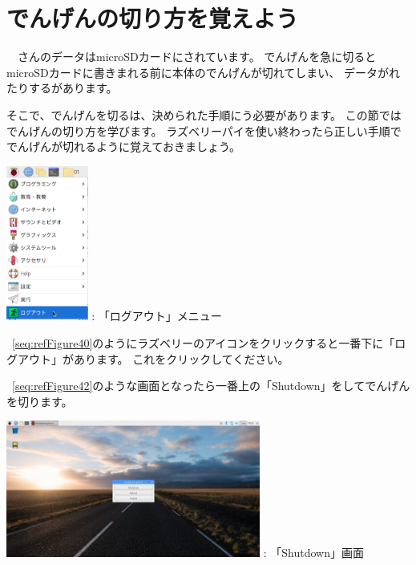 \documentclass[a4paper,12pt]{jarticle}
\begin{document}
\section{でんげんの切り方を覚えよう}
\ \ さんのデータはmicroSDカードにされています。
でんげんを急に切るとmicroSDカードに書きまれる前に本体のでんげんが切れてしまい、
データがれたりするがあります。

そこで、でんげんを切るは、決められた手順にう必要があります。
この節ではでんげんの切り方を学びます。
ラズベリーパイを使い終わったら正しい手順ででんげんが切れるように覚えておきましょう。



\centering
\begin{minipage}{8.115cm}
  {\upshape
    \centering
    \includegraphics[height=5.1cm]{textbook-img206.png}
    \newline
    {\theFigure\label{seq:refFigure40}}: 「ログアウト」メニュー}
\end{minipage}
\begin{minipage}{7.115cm}
  ~\ref{seq:refFigure40}のようにラズベリーのアイコンをクリックすると一番下に「ログアウト」があります。
  これをクリックしてください。
\end{minipage}
\bigskip


\flushleft
\textcolor[rgb]{0.13333334,0.13333334,0.13333334}{~\ref{seq:refFigure42}のような画面となったら一番上の「Shutdown」をしてでんげんを切ります。}
\bigskip
\centering
\begin{minipage}{8.225cm}
  {\upshape
    \includegraphics[height=4.5cm]{textbook-img208.jpg}
    {\theFigure\label{seq:refFigure42}}: 「Shutdown」画面}
\end{minipage}
\end{document}
